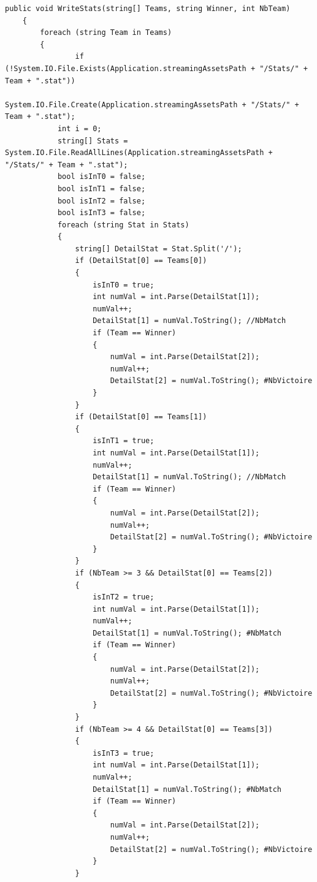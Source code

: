\documentclass{report}
\begin{document}
\begin{lstlisting}[frame=single]
    public void WriteStats(string[] Teams, string Winner, int NbTeam)
    {
        foreach (string Team in Teams)
        {
                if (!System.IO.File.Exists(Application.streamingAssetsPath + "/Stats/" + Team + ".stat"))
                    System.IO.File.Create(Application.streamingAssetsPath + "/Stats/" + Team + ".stat");
            int i = 0;
            string[] Stats = System.IO.File.ReadAllLines(Application.streamingAssetsPath + "/Stats/" + Team + ".stat");
            bool isInT0 = false;
            bool isInT1 = false;
            bool isInT2 = false;
            bool isInT3 = false;
            foreach (string Stat in Stats)
            {
                string[] DetailStat = Stat.Split('/');
                if (DetailStat[0] == Teams[0])
                {
                    isInT0 = true;
                    int numVal = int.Parse(DetailStat[1]);
                    numVal++;
                    DetailStat[1] = numVal.ToString(); //NbMatch
                    if (Team == Winner)
                    {
                        numVal = int.Parse(DetailStat[2]);
                        numVal++;
                        DetailStat[2] = numVal.ToString(); #NbVictoire
                    }
                }
                if (DetailStat[0] == Teams[1])
                {
                    isInT1 = true;
                    int numVal = int.Parse(DetailStat[1]);
                    numVal++;
                    DetailStat[1] = numVal.ToString(); //NbMatch
                    if (Team == Winner)
                    {
                        numVal = int.Parse(DetailStat[2]);
                        numVal++;
                        DetailStat[2] = numVal.ToString(); #NbVictoire
                    }
                }
                if (NbTeam >= 3 && DetailStat[0] == Teams[2])
                {
                    isInT2 = true;
                    int numVal = int.Parse(DetailStat[1]);
                    numVal++;
                    DetailStat[1] = numVal.ToString(); #NbMatch
                    if (Team == Winner)
                    {
                        numVal = int.Parse(DetailStat[2]);
                        numVal++;
                        DetailStat[2] = numVal.ToString(); #NbVictoire
                    }
                }
                if (NbTeam >= 4 && DetailStat[0] == Teams[3])
                {
                    isInT3 = true;
                    int numVal = int.Parse(DetailStat[1]);
                    numVal++;
                    DetailStat[1] = numVal.ToString(); #NbMatch
                    if (Team == Winner)
                    {
                        numVal = int.Parse(DetailStat[2]);
                        numVal++;
                        DetailStat[2] = numVal.ToString(); #NbVictoire
                    }
                }
    

\end{lstlisting}
\end{document}
